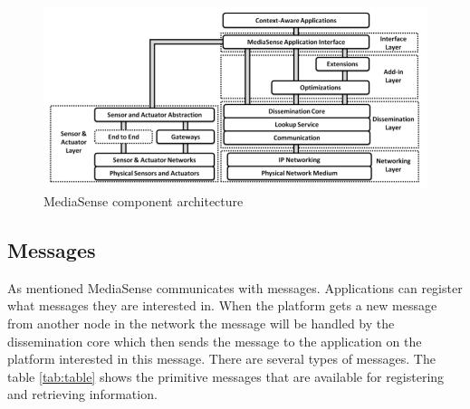 \begin{figure}[t]
	\centering
	\includegraphics[scale=0.50]{part_2/mediasense/ms_arch.png} 	
	\caption{MediaSense component architecture \cite{Kanter539187} }
\end{figure}

\subsection{Messages}
As mentioned MediaSense communicates with messages. Applications can register what messages they are interested in. When the platform gets a new message from another node in the network the message will be handled by the dissemination core which then sends the message to the application on the platform interested in this message. There are several types of messages. The table \ref{tab:table} shows the primitive messages that are available for registering and retrieving information. 


